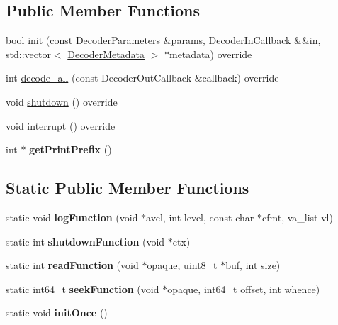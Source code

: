 \subsection*{Public Member Functions}
\begin{DoxyCompactItemize}
\item 
bool \hyperlink{classffmpeg_1_1Decoder_a05d8eb1d33e6a1e19fe92da06fc7792e}{init} (const \hyperlink{structffmpeg_1_1DecoderParameters}{Decoder\+Parameters} \&params, Decoder\+In\+Callback \&\&in, std\+::vector$<$ \hyperlink{structffmpeg_1_1DecoderMetadata}{Decoder\+Metadata} $>$ $\ast$metadata) override
\item 
int \hyperlink{classffmpeg_1_1Decoder_aceb0e1c21883ccd57c1692fccdd17745}{decode\+\_\+all} (const Decoder\+Out\+Callback \&callback) override
\item 
void \hyperlink{classffmpeg_1_1Decoder_a1838e1a5548671a7b19426bff8ff9b3c}{shutdown} () override
\item 
void \hyperlink{classffmpeg_1_1Decoder_a4f0672cd7855e99dbdd7ceceb634d51b}{interrupt} () override
\item 
\mbox{\label{classffmpeg_1_1Decoder_ade0d58a4ec3409697fd2cf4be0d22fa0}} 
int $\ast$ {\bfseries get\+Print\+Prefix} ()
\end{DoxyCompactItemize}
\subsection*{Static Public Member Functions}
\begin{DoxyCompactItemize}
\item 
\mbox{\label{classffmpeg_1_1Decoder_ad152c1dd61dd75cf3ec7be278fb464ee}} 
static void {\bfseries log\+Function} (void $\ast$avcl, int level, const char $\ast$cfmt, va\+\_\+list vl)
\item 
\mbox{\label{classffmpeg_1_1Decoder_a7649c5b7fb01e4b1c0078253c9f3c065}} 
static int {\bfseries shutdown\+Function} (void $\ast$ctx)
\item 
\mbox{\label{classffmpeg_1_1Decoder_ae3322cd6808a03dbf9cff9310abc05b1}} 
static int {\bfseries read\+Function} (void $\ast$opaque, uint8\+\_\+t $\ast$buf, int size)
\item 
\mbox{\label{classffmpeg_1_1Decoder_af86ba7157e7639e5734a3248b20684d8}} 
static int64\+\_\+t {\bfseries seek\+Function} (void $\ast$opaque, int64\+\_\+t offset, int whence)
\item 
\mbox{\label{classffmpeg_1_1Decoder_a50bef3c442754207737be048ea3a3728}} 
static void {\bfseries init\+Once} ()
\end{DoxyCompactItemize}

